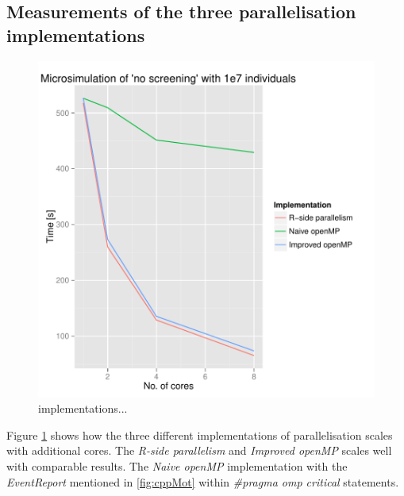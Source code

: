 \subsection{Measurements of the three parallelisation implementations}
\begin{figure}[!htbp] \centering
  \includegraphics[height=0.5\textheight]{images/implementationProfiling.pdf}
  \caption{implementations...}
  \label{fig:implScaling}
\end{figure} 

Figure \ref{fig:implScaling} shows how the three
different implementations of parallelisation scales with additional
cores. The \emph{R-side parallelism} and \emph{Improved openMP} scales
well with comparable results. The \emph{Naive openMP} implementation
with the \emph{EventReport} mentioned in \ref{fig:cppMot} within
\emph{\#pragma omp critical} statements.

